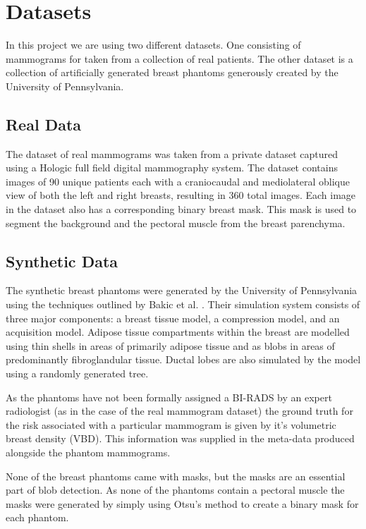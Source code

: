 \section{Datasets}
\label{sec:datasets}
In this project we are using two different datasets. One consisting of mammograms for taken from a collection of real patients. The other dataset is a collection of artificially generated breast phantoms generously created by the University of Pennsylvania. 

\subsection{Real Data}
The dataset of real mammograms was taken from a private dataset captured using a Hologic full field digital mammography system. The dataset contains images of 90 unique patients each with a craniocaudal and mediolateral oblique view of both the left and right breasts, resulting in 360 total images. Each image in the dataset also has a corresponding binary breast mask. This mask is used to segment the  background and the pectoral muscle from the breast parenchyma.

\subsection{Synthetic Data}
The synthetic breast phantoms were generated by the University of Pennsylvania using the techniques outlined by Bakic et al. \cite{bakic2002mammogram1, bakic2002mammogram2, bakic2003mammogram3}. Their simulation system consists of three major components: a breast tissue model, a compression model, and an acquisition model. Adipose tissue compartments within the breast are modelled using thin shells in areas of primarily adipose tissue and as blobs in areas of predominantly fibroglandular tissue. Ductal lobes are also simulated by the model using a randomly generated tree. 

As the phantoms have not been formally assigned a BI-RADS by an expert radiologist (as in the case of the real mammogram dataset) the ground truth for the risk associated with a particular mammogram is given by it's volumetric breast density (VBD). This information was supplied in the meta-data produced alongside the phantom mammograms.

None of the breast phantoms came with masks, but the masks are an essential part of blob detection. As none of the phantoms contain a pectoral muscle the masks were generated by simply using Otsu's method \cite{otsu1975threshold} to create a binary mask for each phantom. 

